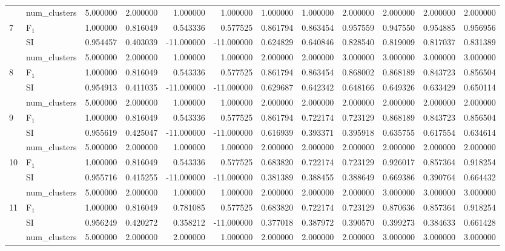 \begin{tabular}{llrrrrrrrrrr}
 & num_clusters & 5.000000 & 2.000000 & 1.000000 & 1.000000 & 1.000000 & 1.000000 & 2.000000 & 2.000000 & 2.000000 & 2.000000 \\
\multirow[c]{3}{*}{7} & F$_1$ & 1.000000 & 0.816049 & 0.543336 & 0.577525 & 0.861794 & 0.863454 & 0.957559 & 0.947550 & 0.954885 & 0.956956 \\
 & SI & 0.954457 & 0.403039 & -11.000000 & -11.000000 & 0.624829 & 0.640846 & 0.828540 & 0.819009 & 0.817037 & 0.831389 \\
 & num_clusters & 5.000000 & 2.000000 & 1.000000 & 1.000000 & 2.000000 & 2.000000 & 3.000000 & 3.000000 & 3.000000 & 3.000000 \\
\multirow[c]{3}{*}{8} & F$_1$ & 1.000000 & 0.816049 & 0.543336 & 0.577525 & 0.861794 & 0.863454 & 0.868002 & 0.868189 & 0.843723 & 0.856504 \\
 & SI & 0.954913 & 0.411035 & -11.000000 & -11.000000 & 0.629687 & 0.642342 & 0.648166 & 0.649326 & 0.633429 & 0.650114 \\
 & num_clusters & 5.000000 & 2.000000 & 1.000000 & 1.000000 & 2.000000 & 2.000000 & 2.000000 & 2.000000 & 2.000000 & 2.000000 \\
\multirow[c]{3}{*}{9} & F$_1$ & 1.000000 & 0.816049 & 0.543336 & 0.577525 & 0.861794 & 0.722174 & 0.723129 & 0.868189 & 0.843723 & 0.856504 \\
 & SI & 0.955619 & 0.425047 & -11.000000 & -11.000000 & 0.616939 & 0.393371 & 0.395918 & 0.635755 & 0.617554 & 0.634614 \\
 & num_clusters & 5.000000 & 2.000000 & 1.000000 & 1.000000 & 2.000000 & 2.000000 & 2.000000 & 2.000000 & 2.000000 & 2.000000 \\
\multirow[c]{3}{*}{10} & F$_1$ & 1.000000 & 0.816049 & 0.543336 & 0.577525 & 0.683820 & 0.722174 & 0.723129 & 0.926017 & 0.857364 & 0.918254 \\
 & SI & 0.955716 & 0.415255 & -11.000000 & -11.000000 & 0.381389 & 0.388455 & 0.388649 & 0.669386 & 0.390764 & 0.664432 \\
 & num_clusters & 5.000000 & 2.000000 & 1.000000 & 1.000000 & 2.000000 & 2.000000 & 2.000000 & 3.000000 & 3.000000 & 3.000000 \\
\multirow[c]{3}{*}{11} & F$_1$ & 1.000000 & 0.816049 & 0.781085 & 0.577525 & 0.683820 & 0.722174 & 0.723129 & 0.870636 & 0.857364 & 0.918254 \\
 & SI & 0.956249 & 0.420272 & 0.358212 & -11.000000 & 0.377018 & 0.387972 & 0.390570 & 0.399273 & 0.384633 & 0.661428 \\
 & num_clusters & 5.000000 & 2.000000 & 2.000000 & 1.000000 & 2.000000 & 2.000000 & 2.000000 & 3.000000 & 3.000000 & 3.000000 \\
\bottomrule
\end{tabular}
